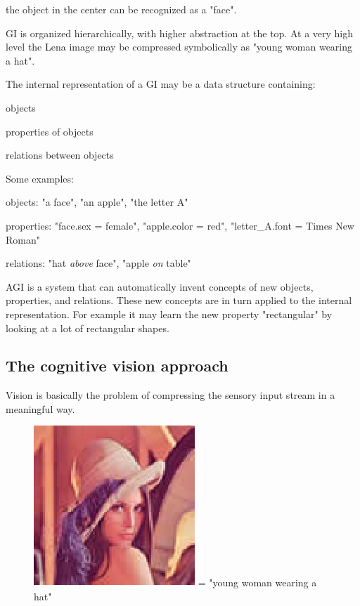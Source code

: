 the object in the center can be recognized as a "face".

GI is organized hierarchically, with higher abstraction at the top. At a very high level the Lena image may be compressed symbolically as "young woman wearing a hat".

The internal representation of a GI may be a data structure containing:
\begin{compactenum}
	\item objects
	\item properties of objects
	\item relations between objects
\end{compactenum}

Some examples:
\begin{compactenum}
	\item objects: "a face", "an apple", "the letter A"
	\item properties: "face.sex = female", "apple.color = red", "letter\_A.font = Times New Roman"
	\item relations: "hat \emph{above} face", "apple \emph{on} table"
\end{compactenum}

AGI is a system that can automatically invent concepts of new objects, properties, and relations. These new concepts are in turn applied to the internal representation. For example it may learn the new property "rectangular" by looking at a lot of rectangular shapes.

\subsection{The cognitive vision approach}

Vision is basically the problem of compressing the sensory input stream in a meaningful way.

\begin{figure}[H]
\centering
\includegraphics[scale=0.7,bb=0 0 103 103]{Lena-Tiny.eps} = "young woman wearing a hat"
\end{figure}

